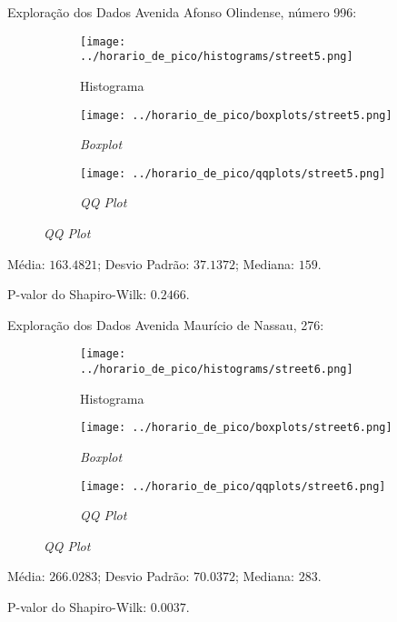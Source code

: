 \begin{frame}{Exploração dos Dados}
Avenida Afonso Olindense, número 996:
\vskip 0.05cm
\begin{figure}
	\centering
	\begin{subfigure}{.33\textwidth}
		\centering
		\texttt{[image: ../horario\_de\_pico/histograms/street5.png]}
		\caption*{Histograma}
	\end{subfigure}%
	\begin{subfigure}{.33\textwidth}
		\centering
		\texttt{[image: ../horario\_de\_pico/boxplots/street5.png]}
		\caption*{\textit{Boxplot}}
	\end{subfigure}
	\begin{subfigure}{.32\textwidth}
		\centering
		\texttt{[image: ../horario\_de\_pico/qqplots/street5.png]}
		\caption*{\textit{QQ Plot}}
	\end{subfigure}
\end{figure}
\vskip 0.05cm
Média: $163.4821$; Desvio Padrão: $37.1372$; Mediana: $159$.

P-valor do Shapiro-Wilk: $0.2466$.
\end{frame}

\begin{frame}{Exploração dos Dados}
Avenida Maurício de Nassau, 276:
\vskip 0.05cm
\begin{figure}
	\centering
	\begin{subfigure}{.33\textwidth}
		\centering
		\texttt{[image: ../horario\_de\_pico/histograms/street6.png]}
		\caption*{Histograma}
	\end{subfigure}%
	\begin{subfigure}{.33\textwidth}
		\centering
		\texttt{[image: ../horario\_de\_pico/boxplots/street6.png]}
		\caption*{\textit{Boxplot}}
	\end{subfigure}
	\begin{subfigure}{.32\textwidth}
		\centering
		\texttt{[image: ../horario\_de\_pico/qqplots/street6.png]}
		\caption*{\textit{QQ Plot}}
	\end{subfigure}
\end{figure}
\vskip 0.05cm
Média: $266.0283$; Desvio Padrão: $70.0372$; Mediana: $283$.

P-valor do Shapiro-Wilk: $0.0037$.
\end{frame}

